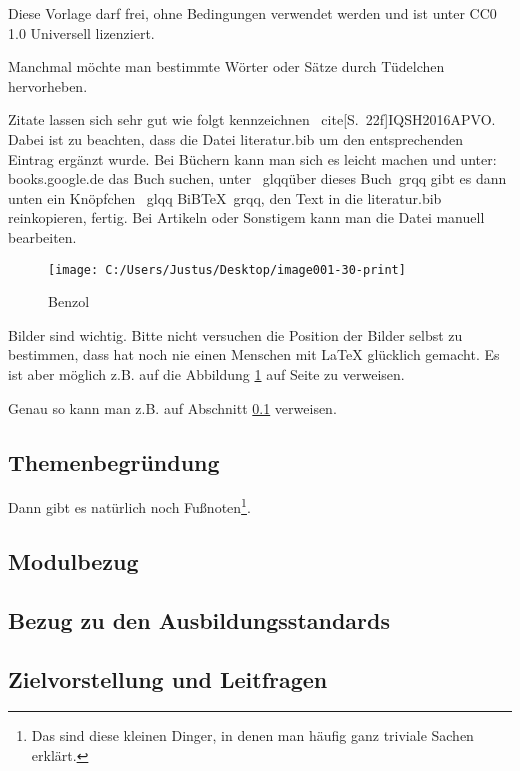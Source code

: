 	Diese Vorlage darf frei, ohne Bedingungen verwendet werden und ist unter CC0 1.0 Universell lizenziert.
	
	Manchmal möchte man bestimmte Wörter oder Sätze durch \glqq Tüdelchen\grqq{} hervorheben.
	
	Zitate lassen sich sehr gut wie folgt kennzeichnen \ cite[S.~22f]{IQSH2016APVO}. Dabei ist zu beachten, dass die Datei literatur.bib um den entsprechenden Eintrag ergänzt wurde. Bei Büchern kann man sich es leicht machen und unter: books.google.de das Buch suchen, unter \ glqqüber dieses Buch\ grqq{} gibt es dann unten ein Knöpfchen \ glqq BiBTeX\ grqq{}, den Text in die literatur.bib reinkopieren, fertig. Bei Artikeln oder Sonstigem kann man die Datei manuell bearbeiten.
	
	\begin{figure}[hbtp]
		\centering
		\texttt{[image: C:/Users/Justus/Desktop/image001-30-print]}
		\caption{Benzol}
		\label{egalWasHauptsacheEindeutig}
	\end{figure}
	
	Bilder sind wichtig. Bitte nicht versuchen die Position der Bilder selbst zu bestimmen, dass hat noch nie einen Menschen mit \LaTeX{} glücklich gemacht. Es ist aber möglich z.B. auf die Abbildung \ref{egalWasHauptsacheEindeutig} auf Seite \pageref{egalWasHauptsacheEindeutig} zu verweisen.
	
	Genau so kann man z.B. auf Abschnitt \ref{darIchNichtVergessenUntenEinzufuegen} verweisen.
	
	
	\subsection{Themenbegründung}
	\label{darIchNichtVergessenUntenEinzufuegen}
	
	Dann gibt es natürlich noch Fußnoten\footnote{Das sind diese kleinen Dinger, in denen man häufig ganz triviale Sachen erklärt.}.
	
	
	\subsection{Modulbezug}
	\subsection{Bezug zu den Ausbildungsstandards}
	\subsection{Zielvorstellung und Leitfragen}
	
